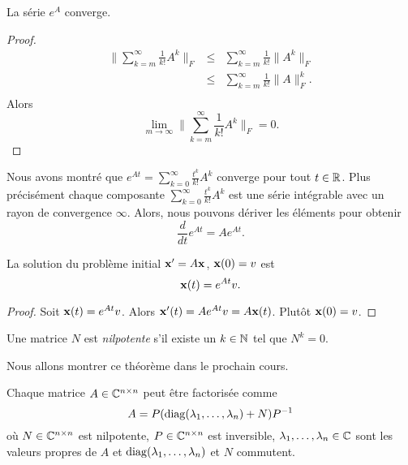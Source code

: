   \begin{lemma}
    \label{lem:17}
    La série $e^A$ converge. 
  \end{lemma}

  \begin{proof}
    \begin{eqnarray*}
      \| \sum_{k=m}^\infty \frac{1}{k!} A^k \|_F & \leq &    \sum_{k=m}^\infty \frac{1}{k!} \|A^k \|_F\\
      & \leq &  \sum_{k=m}^\infty \frac{1}{k!} \|A \|_F^k.\\
    \end{eqnarray*}
Alors 
\begin{displaymath}
  \lim_{m \rightarrow \infty} \|\sum_{k=m}^\infty \frac{1}{k!} A^k \|_F = 0. 
\end{displaymath}
  \end{proof}


Nous avons montré que $e^{At} = \sum_{k=0}^\infty \frac{t^k}{k!} A^k$ converge pour tout $t \in \mathbb{R}$. Plus précisément chaque composante $\sum_{k=0}^\infty \frac{t^k}{k!} A^k$ est une série intégrable avec un rayon de convergence $\infty$. Alors, nous pouvons dériver les éléments pour obtenir 
\begin{equation}
  \label{eq:24}
  \frac{d}{dt} e^{At} = A e^{At}. 
\end{equation}


\begin{theorem}
  \label{thr:31}
  La solution du problème initial $\mathbf{x}' = A\mathbf{x}$, $\mathbf{x}(0) =v$ est 
  \begin{displaymath}
    \mathbf{x}(t) = e^{At} v.
  \end{displaymath}
\end{theorem}

\begin{proof}
  Soit $\mathbf{x}(t) = e^{At} v$. Alors $\mathbf{x}'(t) = A e^{At}v = A\mathbf{x}(t)$. Plutôt $\mathbf{x}(0) = v$. 
\end{proof}

\begin{definition}
  \label{def:29}
  Une matrice $N$ est \emph{nilpotente} s'il existe un $k \in \mathbb{N}$ tel que $N^k = 0$. 
\end{definition}

Nous allons montrer ce théorème dans le prochain cours. 
\begin{theorem}
  \label{thr:32}
  Chaque matrice $A \in \mathbb{C}^{n \times n}$ peut être factorisée comme 
  \begin{displaymath}
    A = P ( \operatorname{diag}(\lambda_1,\dots,\lambda_n) + N) P^{-1}
  \end{displaymath}
où $N \in \mathbb{C}^{n \times n}$ est nilpotente, $P \in \mathbb{C}^{n \times n}$ est inversible,  $\lambda_1,\dots,\lambda_n \in \mathbb{C}$ sont les valeurs propres de $A$ et $\operatorname{diag}(\lambda_1,\dots,\lambda_n)$ et $N$ commutent. 
\end{theorem}


